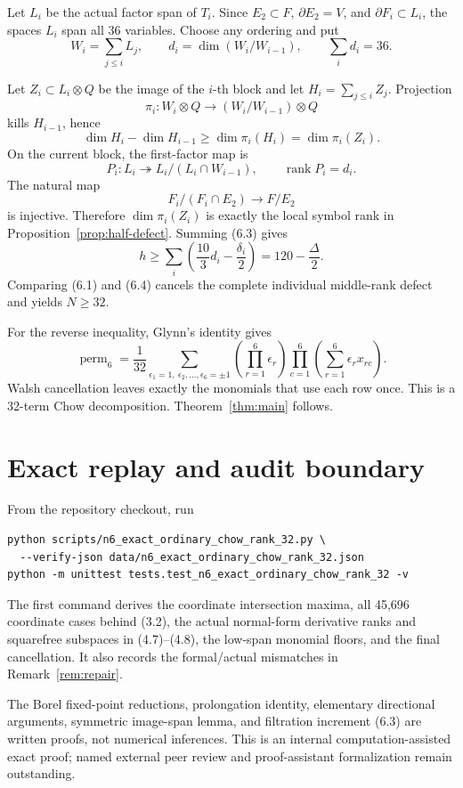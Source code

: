 \documentclass[11pt]{amsart}
\newcommand{\rank}{\operatorname{rank}}
\newcommand{\perm}{\operatorname{perm}}
\theoremstyle{definition}
\begin{document}
Let \(L_i\) be the actual factor span of \(T_i\). Since
\(E_2\subset F\), \(\partial E_2=V\), and \(\partial F_i\subset L_i\),
the spaces \(L_i\) span all 36 variables. Choose any ordering and put
\[
 W_i=\sum_{j\le i}L_j,
 \qquad d_i=\dim(W_i/W_{i-1}),
 \qquad\sum_i d_i=36.
\]

Let \(Z_i\subset L_i\otimes Q\) be the image of the \(i\)-th block and
let \(H_i=\sum_{j\le i}Z_j\). Projection
\[
 \pi_i:W_i\otimes Q\longrightarrow(W_i/W_{i-1})\otimes Q
\]
kills \(H_{i-1}\), hence
\[
 \dim H_i-\dim H_{i-1}\ge\dim\pi_i(H_i)=\dim\pi_i(Z_i). \tag{6.3}
\]
On the current block, the first-factor map is
\[
 P_i:L_i\twoheadrightarrow L_i/(L_i\cap W_{i-1}),
 \qquad\rank P_i=d_i.
\]
The natural map
\[
 F_i/(F_i\cap E_2)\longrightarrow F/E_2
\]
is injective. Therefore \(\dim\pi_i(Z_i)\) is exactly the local symbol rank
in Proposition~\ref{prop:half-defect}. Summing (6.3) gives
\[
 \boxed{h\ge\sum_i\left(\frac{10}{3}d_i-\frac{\delta_i}{2}\right)
 =120-\frac\Delta2.} \tag{6.4}
\]
Comparing (6.1) and (6.4) cancels the complete individual middle-rank defect
and yields \(N\ge32\).

For the reverse inequality, Glynn's identity \cite{Glynn2010} gives
\[
 \perm_6=\frac1{32}
 \sum_{\epsilon_1=1,\ \epsilon_2,\ldots,\epsilon_6=\pm1}
 \left(\prod_{r=1}^6\epsilon_r\right)
 \prod_{c=1}^6\left(\sum_{r=1}^6\epsilon_rx_{rc}\right).
\]
Walsh cancellation leaves exactly the monomials that use each row once. This
is a 32-term Chow decomposition. Theorem~\ref{thm:main} follows.

\section{Exact replay and audit boundary}

From the repository checkout, run
\begin{verbatim}
python scripts/n6_exact_ordinary_chow_rank_32.py \
  --verify-json data/n6_exact_ordinary_chow_rank_32.json
python -m unittest tests.test_n6_exact_ordinary_chow_rank_32 -v
\end{verbatim}
The first command derives the coordinate intersection maxima, all 45,696
coordinate cases behind (3.2), the actual normal-form derivative ranks and
squarefree subspaces in (4.7)--(4.8), the low-span monomial floors, and the
final cancellation. It also records the formal/actual mismatches in
Remark~\ref{rem:repair}.

The Borel fixed-point reductions, prolongation identity, elementary
directional arguments, symmetric image-span lemma, and filtration increment
(6.3) are written proofs, not numerical inferences. This is an internal
computation-assisted exact proof; named external peer review and
proof-assistant formalization remain outstanding.
\end{document}
